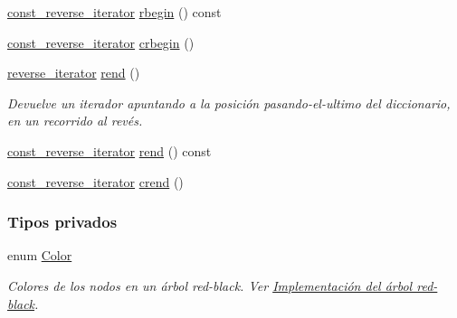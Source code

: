 \begin{Indent}
\begin{DoxyCompactItemize}
\hyperlink{classaed2_1_1iterator_a657402896e5b5966660032f5686cc4c4_a657402896e5b5966660032f5686cc4c4}{const\+\_\+reverse\+\_\+iterator} \hyperlink{classaed2_1_1iterator_a633182fba99ef1a9f10f7bb836f990e0_a633182fba99ef1a9f10f7bb836f990e0}{rbegin} () const
\item 
\hyperlink{classaed2_1_1iterator_a657402896e5b5966660032f5686cc4c4_a657402896e5b5966660032f5686cc4c4}{const\+\_\+reverse\+\_\+iterator} \hyperlink{classaed2_1_1iterator_aa4b6ce667258581859351db42cfd3ee4_aa4b6ce667258581859351db42cfd3ee4}{crbegin} ()
\item 
\hyperlink{classaed2_1_1iterator_a07b2c0fa31611e03cd019b290acd6d80_a07b2c0fa31611e03cd019b290acd6d80}{reverse\+\_\+iterator} \hyperlink{classaed2_1_1iterator_a0007a7962bc6aca8dca78c2a49bd581d_a0007a7962bc6aca8dca78c2a49bd581d}{rend} ()
\begin{DoxyCompactList}\small\item\em Devuelve un iterador apuntando a la posición pasando-\/el-\/ultimo del diccionario, en un recorrido al revés. \end{DoxyCompactList}\item 
\hyperlink{classaed2_1_1iterator_a657402896e5b5966660032f5686cc4c4_a657402896e5b5966660032f5686cc4c4}{const\+\_\+reverse\+\_\+iterator} \hyperlink{classaed2_1_1iterator_ad7d43d936bf4f3957f590723e9029132_ad7d43d936bf4f3957f590723e9029132}{rend} () const
\item 
\hyperlink{classaed2_1_1iterator_a657402896e5b5966660032f5686cc4c4_a657402896e5b5966660032f5686cc4c4}{const\+\_\+reverse\+\_\+iterator} \hyperlink{classaed2_1_1iterator_a2e31ad7ded06c666c6c37c5d30bb41af_a2e31ad7ded06c666c6c37c5d30bb41af}{crend} ()
\end{DoxyCompactItemize}
\end{Indent}
\subsubsection*{Tipos privados}
\begin{DoxyCompactItemize}
\item 
enum \hyperlink{classaed2_1_1iterator_aaa188f82ba585d8de525b1400242cf4f_aaa188f82ba585d8de525b1400242cf4f}{Color} \begin{DoxyCompactList}\small\item\em Colores de los nodos en un árbol red-\/black. Ver \hyperlink{Implementacion}{Implementación del árbol red-\/black}. \end{DoxyCompactList}
\end{DoxyCompactItemize}
